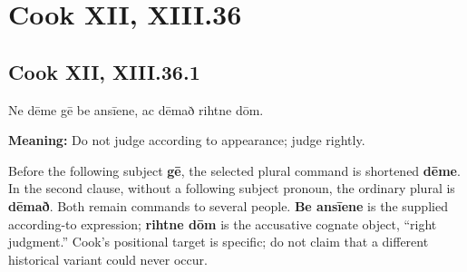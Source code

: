 \clearpage
\section*{Cook XII, XIII.36}

\par\begin{minipage}{\linewidth}\raggedright
\subsection*{Cook XII, XIII.36.1}

Ne dēme gē be ansīene, ac dēmað rihtne dōm.

\textbf{Meaning:} Do not judge according to appearance; judge rightly.

Before the following subject \textbf{gē}, the selected plural command is shortened \textbf{dēme}. In the second clause, without a following subject pronoun, the ordinary plural is \textbf{dēmað}. Both remain commands to several people. \textbf{Be ansīene} is the supplied according-to expression; \textbf{rihtne dōm} is the accusative cognate object, “right judgment.” Cook’s positional target is specific; do not claim that a different historical variant could never occur.

\end{minipage}\par\addvspace{4pt}

